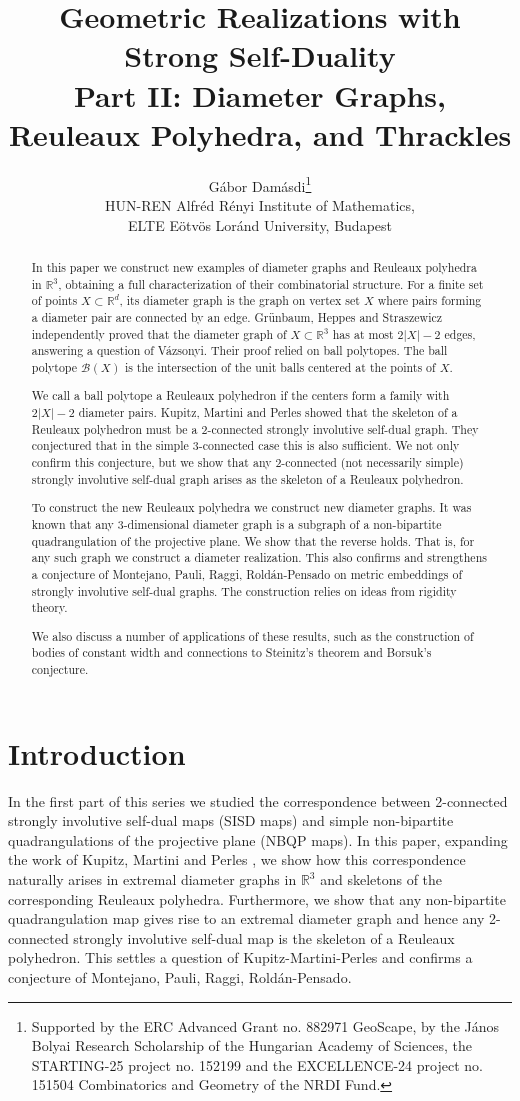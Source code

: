 \documentclass{article}
\title{Geometric Realizations with Strong Self-Duality \\[0.5em]
\large Part II: Diameter Graphs, Reuleaux Polyhedra, and Thrackles}
\author{Gábor Damásdi\footnote{Supported by the ERC Advanced Grant no. 882971 GeoScape, by the János Bolyai Research Scholarship of the Hungarian Academy of Sciences, the STARTING-25 project no. 152199 and the EXCELLENCE-24 project no. 151504 Combinatorics and Geometry of the NRDI Fund.} \\ \small HUN-REN Alfr\'ed R\'enyi Institute of Mathematics,\\ \small ELTE Eötvös Loránd University, Budapest }
\newcounter{example}
\newcommand{\R}[0]{\mathbb{R}}
\begin{document}
\maketitle
\begin{abstract}
 In this paper we construct new examples of diameter graphs and Reuleaux polyhedra in $\mathbb{R}^3$, obtaining a full characterization of their combinatorial structure. For a finite set of points $X\subset\mathbb{R}^d$, its diameter graph is the graph on vertex set $X$ where pairs forming a diameter pair are connected by an edge. Grünbaum, Heppes and Straszewicz independently proved that the diameter graph of $X\subset \R^3$ has at most $2|X|-2$ edges, answering a question of Vázsonyi. Their proof relied on ball polytopes. The ball polytope $\mathcal{B}(X)$ is the intersection of the unit balls centered at the points of $X$. 
 
 We call a ball polytope a Reuleaux polyhedron if the centers form a family with $2|X|-2$ diameter pairs. Kupitz, Martini and Perles showed that the skeleton of a Reuleaux polyhedron must be a 2-connected strongly involutive self-dual graph. They conjectured that in the simple 3-connected case this is also sufficient. We not only confirm this conjecture, but we show that any 2-connected (not necessarily simple) strongly involutive self-dual graph arises as the skeleton of a Reuleaux polyhedron. 
 
To construct the new Reuleaux polyhedra we construct new diameter graphs.  It was known that any 3-dimensional diameter graph is a subgraph of a non-bipartite quadrangulation of the projective plane. We show that the reverse holds. That is, for any such graph we construct a diameter realization.  This also confirms and strengthens a conjecture of Montejano, Pauli, Raggi, Roldán-Pensado on metric embeddings of strongly involutive self-dual graphs. The construction relies on ideas from rigidity theory.

We also discuss a  number of applications of these results, such as the construction of bodies of constant width and connections to Steinitz's theorem and Borsuk's conjecture.
 \end{abstract}

\section{Introduction}




In the first part of this series we studied the correspondence between 2-connected strongly involutive self-dual maps (SISD maps) and  simple non-bipartite quadrangulations of the projective plane (NBQP maps). In this paper, expanding the work of Kupitz, Martini and Perles \cite{kupitz2010ball}, we  show how this correspondence naturally arises in extremal diameter graphs in $\R^3$ and skeletons of the corresponding Reuleaux polyhedra. Furthermore, we show that any non-bipartite quadrangulation map gives rise to an extremal diameter graph and hence any 2-connected strongly involutive self-dual map is the skeleton of a Reuleaux polyhedron. This settles a question of Kupitz-Martini-Perles and confirms a conjecture of Montejano, Pauli, Raggi, Roldán-Pensado.  
\end{document}
